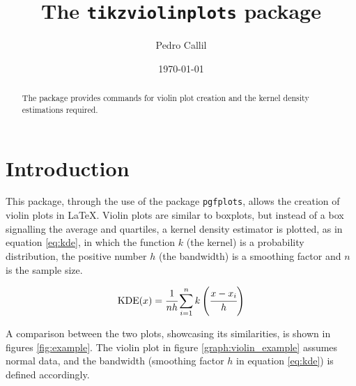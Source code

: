\documentclass{article}
\title{The \texttt{tikzviolinplots} package}
\author{Pedro Callil}
\date{\today}
\begin{document}
\maketitle

\tableofcontents

\begin{abstract}
	The package provides commands for violin plot creation and
	the kernel density estimations required.
\end{abstract}

\section{Introduction}

This package, through the use of the package \texttt{pgfplots}, allows the
creation of violin plots in \LaTeX. Violin plots are similar to boxplots,
but instead of a box signalling the average and quartiles, a kernel density
estimator is plotted, as in equation \ref{eq:kde}, in which the function $k$
(the kernel) is a probability distribution, the positive number $h$ (the
bandwidth) is a smoothing factor and $n$ is the sample size.

\begin{equation}
	\label{eq:kde}
	\textnormal{KDE}(x) = %
	\cfrac{1}{nh}\sum_{i=1}^nk\left(\cfrac{x-x_i}{h}\right)
\end{equation}

A comparison between the two plots, showcasing its similarities, is
shown in figures \ref{fig:example}. The violin plot in figure
\ref{graph:violin_example} assumes normal data, and the bandwidth
(smoothing factor $h$ in equation \ref{eq:kde}) is defined accordingly.

\pgfplotsset{height=1.6\linewidth}
\end{document}
